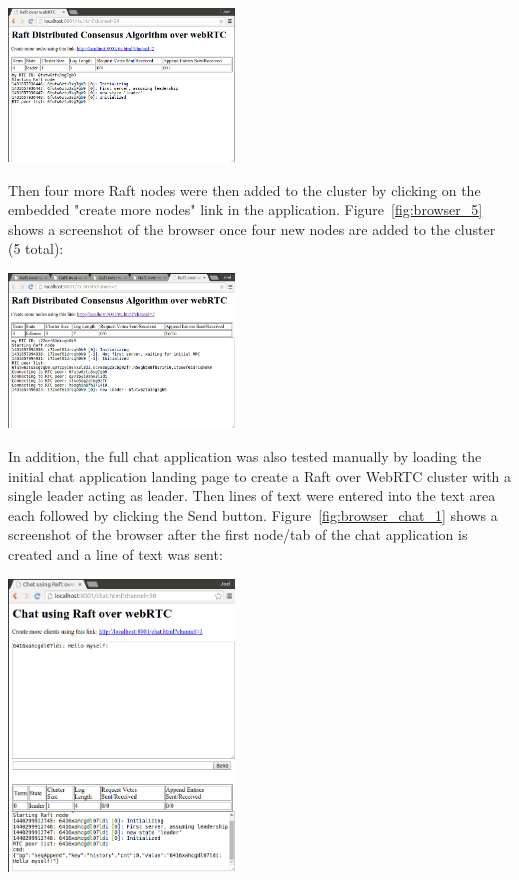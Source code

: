 \documentclass[9pt]{extarticle}
\begin{document}
\begin{multicols}{2}
\begin{center}
    \includegraphics[width=0.45\textwidth]{imgs/browser_1.png}
    \label{fig:browser_1}
\end{center}

Then four more Raft nodes were then added to the cluster by clicking
on the embedded "create more nodes" link in the application.
Figure~\ref{fig:browser_5} shows a screenshot of the browser once four
new nodes are added to the cluster (5 total):

\begin{center}
    \includegraphics[width=0.45\textwidth]{imgs/browser_5.png}
    \label{fig:browser_5}
\end{center}

In addition, the full chat application was also tested manually by
loading the initial chat application landing page to create a Raft
over WebRTC cluster with a single leader acting as leader. Then lines
of text were entered into the text area each followed by clicking the
Send button. Figure~\ref{fig:browser_chat_1} shows a screenshot of the
browser after the first node/tab of the chat application is created
and a line of text was sent:

\begin{center}
    \includegraphics[width=0.45\textwidth]{imgs/chat_1a.png}
    \label{fig:browser_chat_1}
\end{center}


\end{multicols}
\end{document}

